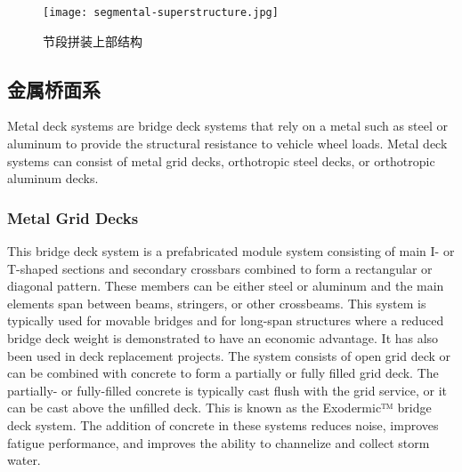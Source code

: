 \begin{figure}
  \texttt{[image: segmental-superstructure.jpg]}
  \caption{节段拼装上部结构}
  \label{fig:segmental-superstructure}
\end{figure}

\subsection{金属桥面系}
Metal deck systems are bridge deck systems that rely on a metal such as steel or aluminum to provide the structural resistance to vehicle wheel loads. Metal deck systems can consist of metal grid decks, orthotropic steel decks, or orthotropic aluminum decks.

\subsubsection{Metal Grid Decks}
This bridge deck system is a prefabricated module system consisting of main I- or T-shaped sections and secondary crossbars combined to form a rectangular or diagonal pattern. These members can be either steel or aluminum and the main elements span between beams, stringers, or other crossbeams. This system is typically used for movable bridges and for long-span structures where a reduced bridge deck weight is demonstrated to have an economic advantage. It has also been used in deck replacement projects. The system consists of open grid deck or can be combined with concrete to form a partially or fully filled grid deck. The partially- or fully-filled concrete is typically cast flush with the grid service, or it can be cast above the unfilled deck. This is known as the Exodermic™ bridge deck system. The addition of concrete in these systems reduces noise, improves fatigue performance, and improves the ability to channelize and collect storm water.


